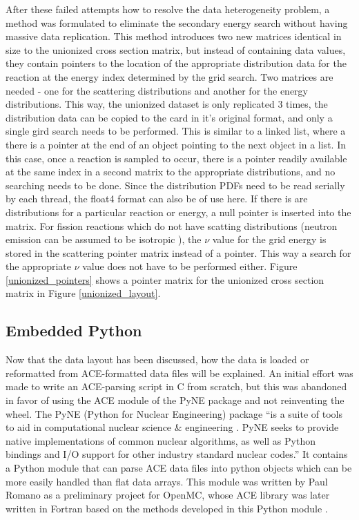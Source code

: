 After these failed attempts how to resolve the data heterogeneity problem, a method was formulated to eliminate the secondary energy search without having massive data replication.  This method introduces two new matrices identical in size to the unionized cross section matrix, but instead of containing data values, they contain pointers to the location of the appropriate distribution data for the reaction at the energy index determined by the grid search.  Two matrices are needed - one for the scattering distributions and another for the energy distributions.  This way, the unionized dataset is only replicated 3 times, the distribution data can be copied to the card in it's original format, and only a single gird search needs to be performed.  This is similar to a linked list, where a there is a pointer at the end of an object pointing to the next object in a list.  In this case, once a reaction is sampled to occur, there is a pointer readily available at the same index in a second matrix to the appropriate distributions, and no searching needs to be done.  Since the distribution PDFs need to be read serially by each thread, the float4 format can also be of use here.  If there is are distributions for a particular reaction or energy, a null pointer is inserted into the matrix.  For fission reactions which do not have scatting distributions (neutron emission can be assumed to be isotropic \cite{openmc}), the $\nu$ value for the grid energy is stored in the scattering pointer matrix instead of a pointer.  This way a search for the appropriate $\nu$ value does not have to be performed either.  Figure \ref{unionized_pointers} shows a pointer matrix for the unionized cross section matrix in Figure \ref{unionized_layout}.

\subsection{Embedded Python}

Now that the data layout has been discussed, how the data is loaded or reformatted from ACE-formatted data files will be explained.  An initial effort was made to write an ACE-parsing script in C from scratch, but this was abandoned in favor of using the ACE module of the PyNE package and not reinventing the wheel.  The PyNE (Python for Nuclear Engineering) package ``is a suite of tools to aid in computational nuclear science \& engineering \cite{pyne}. PyNE seeks to provide native implementations of common nuclear algorithms, as well as Python bindings and I/O support for other industry standard nuclear codes.''  It contains a Python module that can parse ACE data files into python objects which can be more easily handled than flat data arrays.  This module was written by Paul Romano as a preliminary project for OpenMC, whose ACE library was later written in Fortran based on the methods developed in this Python module \cite{pyne,openmc}.  

